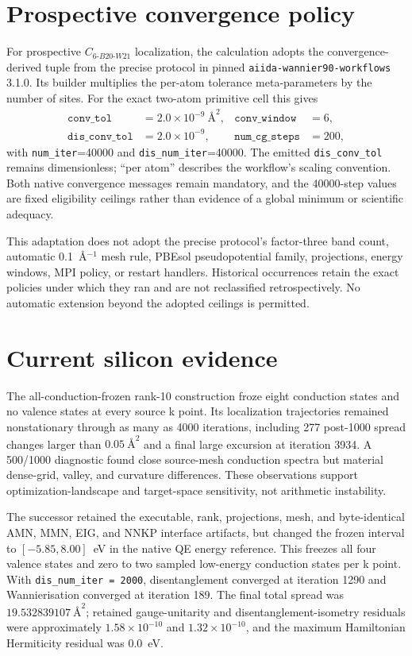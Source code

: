 \documentclass[11pt]{article}
\begin{document}
\section{Prospective convergence policy}

For prospective $C_{6\text{-}B20\text{-}W21}$ localization, the calculation adopts
the convergence-derived tuple from the precise protocol in pinned
\texttt{aiida-wannier90-workflows} 3.1.0.  Its builder multiplies the per-atom tolerance
meta-parameters by the number of sites.  For the exact two-atom primitive cell this
gives
\begin{align}
  \texttt{conv\_tol} &= 2.0\times10^{-9}\ \text{\AA}^{2}, &
  \texttt{conv\_window} &= 6, \\
  \texttt{dis\_conv\_tol} &= 2.0\times10^{-9}, &
  \texttt{num\_cg\_steps} &= 200,
\end{align}
with \texttt{num\_iter}=40000 and \texttt{dis\_num\_iter}=40000.  The emitted
\texttt{dis\_conv\_tol} remains dimensionless; ``per atom'' describes the workflow's
scaling convention.  Both native convergence messages remain mandatory, and the
40000-step values are fixed eligibility ceilings rather than evidence of a global
minimum or scientific adequacy.

This adaptation does not adopt the precise protocol's factor-three band count,
automatic 0.1~\AA$^{-1}$ mesh rule, PBEsol pseudopotential family, projections, energy
windows, MPI policy, or restart handlers.  Historical occurrences retain the exact
policies under which they ran and are not reclassified retrospectively.  No automatic
extension beyond the adopted ceilings is permitted.

\section{Current silicon evidence}

The all-conduction-frozen rank-10 construction froze eight conduction states and no
valence states at every source k point.  Its localization trajectories remained
nonstationary through as many as 4000 iterations, including 277 post-1000 spread changes
larger than $0.05\ \text{\AA}^{2}$ and a final large excursion at iteration 3934.  A
500/1000 diagnostic found close source-mesh conduction spectra but material dense-grid,
valley, and curvature differences.  These observations support optimization-landscape
and target-space sensitivity, not arithmetic instability.

The successor retained the executable, rank, projections, mesh, and byte-identical
AMN, MMN, EIG, and NNKP interface artifacts, but changed the frozen interval to
$[-5.85,8.00]$~eV in the native QE energy reference.  This freezes all four valence
states and zero to two sampled low-energy conduction states per k point.  With
\texttt{dis\_num\_iter = 2000}, disentanglement converged at iteration 1290 and
Wannierisation converged at iteration 189.  The final total spread was
$19.532839107\ \text{\AA}^{2}$; retained gauge-unitarity and disentanglement-isometry
residuals were approximately $1.58\times10^{-10}$ and $1.32\times10^{-10}$, and the
maximum Hamiltonian Hermiticity residual was $0.0$~eV.
\end{document}
